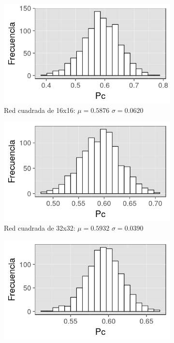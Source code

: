 \documentclass[%
 reprint,
 amsmath,amssymb,
 aps,
spanish]{revtex4-1}
\begin{document}
\begin{figure}[h]
\begin{subfigure}{.25\textwidth}
  \centering
  \includegraphics[width=.9\linewidth]{ej1a/hist16x16}
  \caption{Red cuadrada de 16x16: $\mu=0.5876$ $\sigma=0.0620$}
  \label{fig:1ahist}
\end{subfigure}%
\begin{subfigure}{.25\textwidth}
  \centering
  \includegraphics[width=.9\linewidth]{ej1a/hist32x32}
  \caption{Red cuadrada de 32x32: $\mu=0.5932$ $\sigma=0.0390$}
  \label{fig:1ahist}
\end{subfigure}
\begin{subfigure}{.25\textwidth}
  \centering
  \includegraphics[width=.9\linewidth]{ej1a/hist64x64}

\end{subfigure}
\end{figure}
\end{document}
